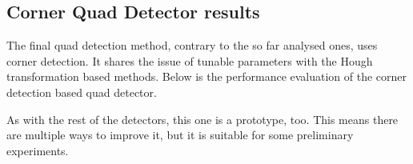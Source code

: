 \clearpage\subsection{Corner Quad Detector results}

The final quad detection method, contrary to the so far analysed ones, uses corner detection.
It shares the issue of tunable parameters with the Hough transformation based methods.
Below is the performance evaluation of the corner detection based quad detector.

As with the rest of the detectors, this one is a prototype, too.
This means there are multiple ways to improve it, but it is suitable for some preliminary experiments.

